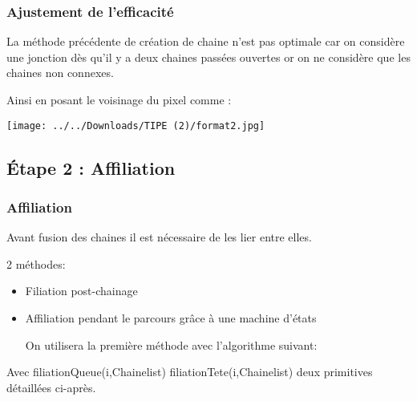 \documentclass{beamer}
\begin{document}
\begin{frame}
\frametitle{Ajustement de l'efficacité}
La méthode précédente de création de chaine n'est pas optimale car on considère une jonction dès qu'il y a deux chaines passées ouvertes or on ne considère que les chaines non connexes.



Ainsi en posant le voisinage du pixel comme :

\begin{center}
\texttt{[image: ../../Downloads/TIPE (2)/format2.jpg]}
\end{center}


\begin{center}
\end{center}
\end{frame}
\subsection{Étape 2 : Affiliation}
\begin{frame}[fragile]
\frametitle{Affiliation}

Avant fusion des chaines il est nécessaire de les lier entre elles.

2 méthodes:
\begin{itemize}
\item Filiation post-chainage
\item Affiliation pendant le parcours grâce à une machine d'états

On utilisera la première méthode avec l'algorithme suivant:
\end{itemize}
\begin{center}
\end{center}
Avec filiationQueue(i,Chainelist) filiationTete(i,Chainelist) deux primitives détaillées ci-après.
\end{frame}
\end{document}
